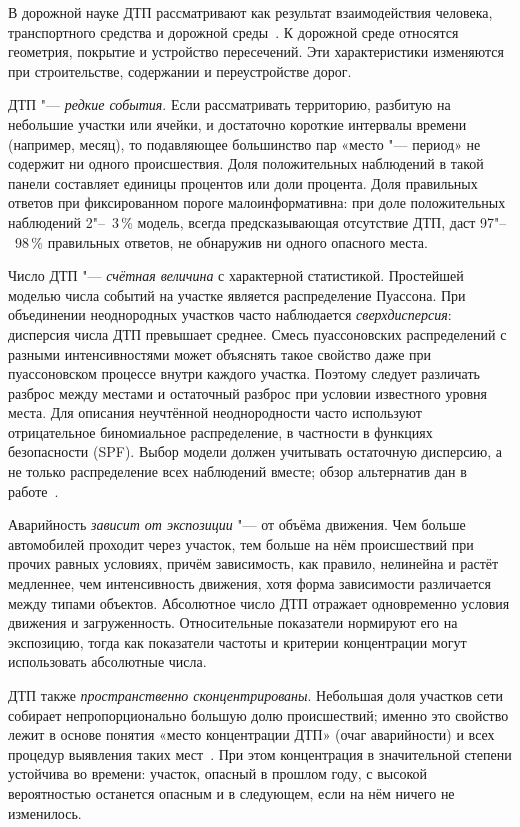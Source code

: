 \documentclass[coursework]{SCWorks}
\begin{document}
В дорожной науке ДТП рассматривают как результат взаимодействия
человека, транспортного средства и дорожной среды~\cite{babkov1993,hsm2010}.
К дорожной среде относятся геометрия, покрытие и устройство пересечений.
Эти характеристики изменяются при строительстве, содержании
и переустройстве дорог.

ДТП "--- \emph{редкие события}. Если рассматривать
территорию, разбитую на небольшие участки или ячейки, и достаточно
короткие интервалы времени (например, месяц), то подавляющее большинство
пар «место "--- период» не содержит ни одного происшествия. Доля
положительных наблюдений в такой панели составляет единицы процентов или
доли процента. Доля правильных ответов при фиксированном пороге
малоинформативна: при доле положительных наблюдений 2"--~3\,\%
модель, всегда предсказывающая отсутствие ДТП, даст 97"--~98\,\%
правильных ответов, не обнаружив ни одного опасного места.

Число ДТП "--- \emph{счётная величина} с характерной
статистикой. Простейшей моделью числа событий на участке является
распределение Пуассона. При объединении неоднородных участков часто
наблюдается \emph{сверхдисперсия}: дисперсия числа ДТП превышает
среднее. Смесь пуассоновских распределений с разными интенсивностями
может объяснять такое свойство даже при пуассоновском процессе внутри
каждого участка. Поэтому следует различать разброс между местами и
остаточный разброс при условии известного уровня места. Для описания
неучтённой неоднородности часто используют отрицательное биномиальное
распределение, в частности в функциях безопасности (SPF). Выбор модели
должен учитывать остаточную дисперсию, а не только распределение всех
наблюдений вместе; обзор альтернатив дан в работе~\cite{lord2010}.

Аварийность \emph{зависит от экспозиции} "--- от объёма
движения. Чем больше автомобилей проходит через участок,
тем больше на нём происшествий при прочих равных условиях, причём
зависимость, как правило, нелинейна и растёт медленнее, чем
интенсивность движения, хотя форма зависимости различается между
типами объектов. Абсолютное число ДТП отражает одновременно условия
движения и загруженность. Относительные показатели нормируют его на
экспозицию, тогда как показатели частоты и критерии концентрации могут
использовать абсолютные числа.

ДТП также \emph{пространственно сконцентрированы}. Небольшая
доля участков сети собирает непропорционально большую долю
происшествий; именно это свойство лежит в основе понятия «место
концентрации ДТП» (очаг аварийности) и всех процедур выявления таких
мест~\cite{odm2015}. При этом концентрация в значительной степени
устойчива во времени: участок, опасный в прошлом году, с высокой
вероятностью останется опасным и в следующем, если на нём ничего не
изменилось.
\end{document}
